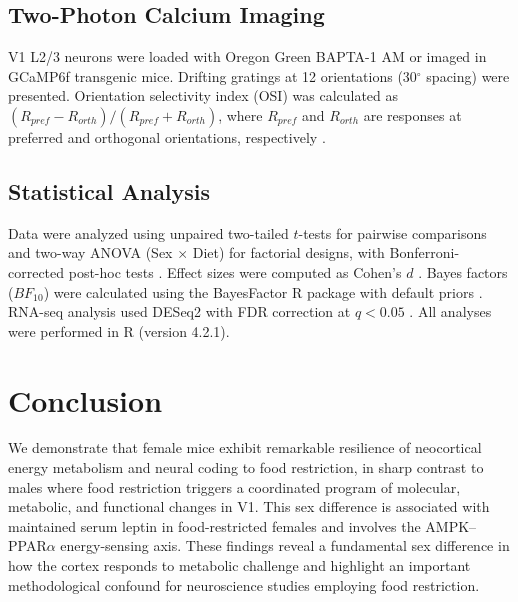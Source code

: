 \documentclass[11pt]{article}
\begin{document}
\subsection{Two-Photon Calcium Imaging}

V1 L2/3 neurons were loaded with Oregon Green BAPTA-1 AM or imaged in GCaMP6f transgenic mice. Drifting gratings at 12 orientations (30$^{\circ}$ spacing) were presented. Orientation selectivity index (OSI) was calculated as $(R_{pref} - R_{orth})/(R_{pref} + R_{orth})$, where $R_{pref}$ and $R_{orth}$ are responses at preferred and orthogonal orientations, respectively \citep{orientation_selectivity2012}.

\subsection{Statistical Analysis}

Data were analyzed using unpaired two-tailed $t$-tests for pairwise comparisons and two-way ANOVA (Sex $\times$ Diet) for factorial designs, with Bonferroni-corrected post-hoc tests \citep{bonferroni_correction1936}. Effect sizes were computed as Cohen's $d$ \citep{cohen_effect_size1988}. Bayes factors ($BF_{10}$) were calculated using the BayesFactor R package with default priors \citep{bayes_factor2018}. RNA-seq analysis used DESeq2 with FDR correction at $q < 0.05$ \citep{deseq2_love2014}. All analyses were performed in R (version 4.2.1).

\section{Conclusion}

We demonstrate that female mice exhibit remarkable resilience of neocortical energy metabolism and neural coding to food restriction, in sharp contrast to males where food restriction triggers a coordinated program of molecular, metabolic, and functional changes in V1. This sex difference is associated with maintained serum leptin in food-restricted females and involves the AMPK--PPAR$\alpha$ energy-sensing axis. These findings reveal a fundamental sex difference in how the cortex responds to metabolic challenge and highlight an important methodological confound for neuroscience studies employing food restriction.



\end{document}
